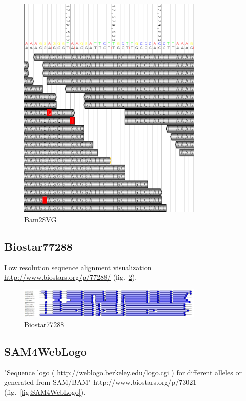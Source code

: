 \documentclass{article}
\begin{document}
\begin{figure}[!]
 \includegraphics[width=0.8\textwidth]{bam2graphics.png}
 \caption{Bam2SVG}
 \label{fig:Bam2SVG}
\end{figure}

\subsection{Biostar77288}
Low resolution sequence alignment visualization \url{http://www.biostars.org/p/77288/}  (fig.~\ref{fig:Biostar77288}).

\begin{figure}[!]
 \includegraphics[width=0.8\textwidth]{biostar77288.png}
 \caption{Biostar77288}
 \label{fig:Biostar77288}
\end{figure}

\subsection{SAM4WebLogo}
"Sequence logo ( http://weblogo.berkeley.edu/logo.cgi ) for different alleles or generated from SAM/BAM" http://www.biostars.org/p/73021  (fig.~\ref{fig:SAM4WebLogo}).
\end{document}

